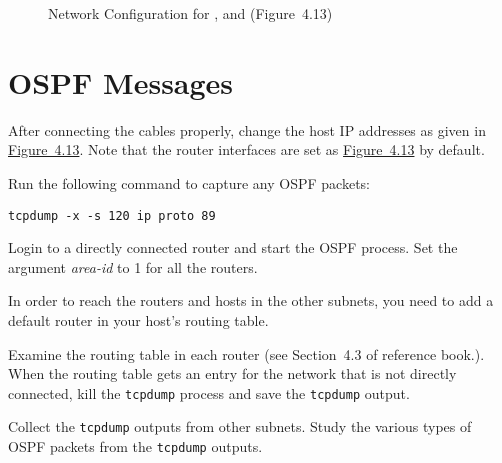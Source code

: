 \documentclass{../UTNetLab}
\begin{document}
\begin{figure}[H]
        \caption{Network Configuration for ,  and  (Figure~4.13)}\label{fig:4.13}
    \end{figure}

\section{OSPF Messages}
    After connecting the cables properly, change the host IP addresses as given in \hyperref[fig:4.13]{Figure~4.13}.
    Note that the router interfaces are set as \hyperref[fig:4.13]{Figure~4.13} by default.

    Run the following command to capture any OSPF packets: 
    \begin{lstlisting}
tcpdump -x -s 120 ip proto 89
    \end{lstlisting}

    Login to a directly connected router and start the OSPF process.
    Set the argument \textit{area-id} to 1 for all the routers.

    In order to reach the routers and hosts in the other subnets, you need to add a default router in your host’s routing table.

    Examine the routing table in each router (see Section~4.3 of reference book.).
    When the routing table gets an entry for the network that is not directly connected, kill the \lstinline{tcpdump} process and save the \lstinline{tcpdump} output.

    Collect the \lstinline{tcpdump} outputs from other subnets.
    Study the various types of OSPF packets from the \lstinline{tcpdump} outputs.
\end{document}
